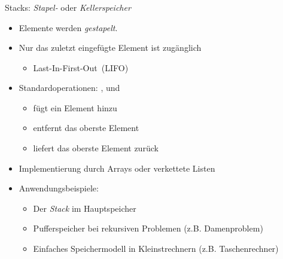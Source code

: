 \begin{frame}
\frametitle{\insertsection}
\begin{block}
{Stacks: \emph{Stapel-} oder \emph{Kellerspeicher}}
\begin{itemize}
	\item Elemente werden \emph{gestapelt}.
	\item Nur das zuletzt eingefügte Element ist zugänglich
	\begin{itemize}
		\item \glqq Last-In-First-Out\grqq\ (LIFO)
	\end{itemize}
	\item<2-> Standardoperationen: ,  und 
	\begin{itemize}
		\item {} fügt ein Element hinzu
		\item {} entfernt das oberste Element
		\item {} liefert das oberste Element zurück
	\end{itemize}
	\item<3-> Implementierung durch Arrays oder verkettete Listen
	\item<4-> Anwendungsbeispiele:
	\begin{itemize}
		\item Der \emph{Stack} im Hauptspeicher
		\item Pufferspeicher bei rekursiven Problemen (z.B. Damenproblem)
		\item Einfaches Speichermodell in Kleinstrechnern (z.B. Taschenrechner)
	\end{itemize}
\end{itemize}
\end{block}
\end{frame}